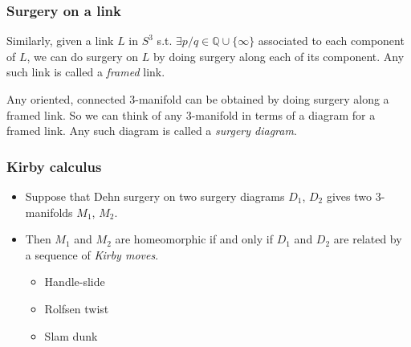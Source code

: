 \documentclass{beamer}
\theoremstyle{ex}
\theoremstyle{rem}
\begin{document}
	

	\begin{frame}
	\frametitle{Surgery on a link}
		\begin{definition}
		Similarly, given a link $L$ in $S^3$ s.t. $\exists p/q \in \mathbb{Q}\cup\{\infty\}$ associated to each component of $L$, we can do surgery on $L$ by doing surgery along each of its component. Any such link is called a \textit{framed} link. 
		\end{definition}
	
	
		\begin{theorem}
		Any oriented, connected $3$-manifold can be obtained by doing surgery along a framed link. So we can think of any $3$-manifold in terms of a diagram for a framed link. Any such diagram is called a \textit{surgery diagram}. 
		\end{theorem}
		
	\end{frame}

	

	

	
	
	\begin{frame}
		\frametitle{Kirby calculus}
		\begin{itemize}
			\item Suppose that Dehn surgery on two surgery diagrams $D_1$, $D_2$ gives two $3$-manifolds $M_1$, $M_2$.
			\pause
			\item Then $M_1$ and $M_2$ are homeomorphic if and only if $D_1$ and $D_2$ are related by a sequence of \textit{Kirby moves}.
			\pause
			\begin{itemize}
				\item Handle-slide
				\pause
				\item Rolfsen twist
				\pause
				\item Slam dunk
			\end{itemize}
		\end{itemize}
	\end{frame}
	
\end{document}
